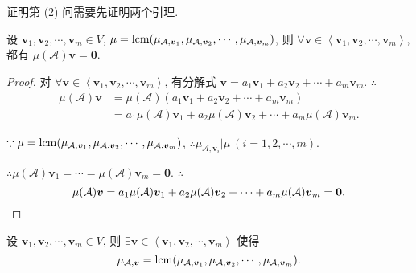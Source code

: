 \documentclass[color=black,device=normal,lang=cn,mode=geye]{elegantnote}
\begin{document}
证明第 (2) 问需要先证明两个引理.
\begin{lemma}\label{l6.2}
    设 $\boldsymbol{v}_1,\boldsymbol{v}_2,\cdots,\boldsymbol{v}_m\in V$, $\mu=\operatorname{lcm}(\mu_{\mathcal{A},\boldsymbol{v}_1},\mu_{\mathcal{A},\boldsymbol{v}_2},\cdots,\mu_{\mathcal{A},\boldsymbol{v}_m})$, 则 $\forall\boldsymbol{v}\in\left<\boldsymbol{v}_1,\boldsymbol{v}_2,\cdots,\boldsymbol{v}_m\right>$, 都有 $\mu(\mathcal{A})\boldsymbol{v}=\boldsymbol{0}$.
\end{lemma}
\begin{proof}
    对 $\forall\boldsymbol{v}\in\left<\boldsymbol{v}_1,\boldsymbol{v}_2,\cdots,\boldsymbol{v}_m\right>$, 有分解式 $\boldsymbol{v}=a_1\boldsymbol{v}_1+a_2\boldsymbol{v}_2+\cdots+a_m\boldsymbol{v}_m$. $\therefore$
    \begin{align*}
        \mu(\mathcal{A})\boldsymbol{v} & =\mu(\mathcal{A})(a_1\boldsymbol{v}_1+a_2\boldsymbol{v}_2+\cdots+a_m\boldsymbol{v}_m) \\
        & =a_1\mu(\mathcal{A})\boldsymbol{v}_1+a_2\mu(\mathcal{A})\boldsymbol{v}_2+\cdots+a_m\mu(\mathcal{A})\boldsymbol{v}_m.
    \end{align*}

    $\because\mu=\operatorname{lcm}(\mu_{\mathcal{A},\boldsymbol{v}_1},\mu_{\mathcal{A},\boldsymbol{v}_2},\cdots,\mu_{\mathcal{A},\boldsymbol{v}_m})$, 
    $\therefore\mu_{\mathcal{A},\boldsymbol{v}_i}|\mu\ (i=1,2,\cdots,m)$.
    
    $\therefore\mu(\mathcal{A})\boldsymbol{v}_1=\cdots=\mu(\mathcal{A})\boldsymbol{v}_m=\boldsymbol{0}$. $\therefore$
    \[\mu(\mathcal{A})\boldsymbol{v}=a_1\mu(\mathcal{A})\boldsymbol{v}_1+a_2\mu(\mathcal{A})\boldsymbol{v}_2+\cdots+a_m\mu(\mathcal{A})\boldsymbol{v}_m=\boldsymbol{0}.\qedhere\]
\end{proof}
\begin{lemma}\label{l6.3}
    设 $\boldsymbol{v}_1,\boldsymbol{v}_2,\cdots,\boldsymbol{v}_m\in V$, 则 $\exists\boldsymbol{v}\in\left<\boldsymbol{v}_1,\boldsymbol{v}_2,\cdots,\boldsymbol{v}_m\right>$ 使得
    \[\mu_{\mathcal{A},\boldsymbol{v}}=\operatorname{lcm}(\mu_{\mathcal{A},\boldsymbol{v}_1},\mu_{\mathcal{A},\boldsymbol{v}_2},\cdots,\mu_{\mathcal{A},\boldsymbol{v}_m}).\]
\end{lemma}
\end{document}
